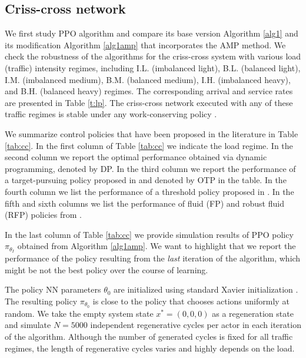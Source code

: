 \documentclass[11pt]{article}
\theoremstyle{definition}
\numberwithin{equation}{section}
\begin{document}
\subsection{Criss-cross network}

 We first study PPO algorithm and compare its base version Algorithm \ref{alg1} and its modification Algorithm \ref{alg1amp} that incorporates the  AMP method.  We check the robustness of the algorithms for the criss-cross system  with  various load (traffic) intensity regimes, including    I.L. (imbalanced light), B.L. (balanced light), I.M. (imbalanced medium), B.M. (balanced medium), I.H. (imbalanced heavy), and B.H. (balanced heavy) regimes.   The corresponding arrival and service rates are presented in Table \ref{t:lp}. The criss-cross network executed with any of these traffic regimes is stable under any work-conserving policy  \cite{Dai1996}.






We summarize control policies that have been proposed in the literature in Table \ref{tab:cc}. In the first column of Table \ref{tab:cc} we indicate the load regime. In the second column we report the optimal performance obtained via dynamic programming, denoted by DP.  In the third column
we report the performance of a target-pursuing
policy proposed in \cite{Paschalidis2004} and denoted by OTP in the table. In the fourth column we list the performance of a threshold policy proposed in \cite{Harrison1990}.
 In the fifth and sixth columns
we list the performance of fluid (FP) and robust fluid (RFP) policies from  \cite{Bertsimas2015}.

In the last column of Table \ref{tab:cc} we provide simulation results of PPO policy $\pi_{\theta_I}$ obtained from Algorithm \ref{alg1amp}. We want to highlight that we report the performance of the policy resulting from the \textit{last} iteration of the algorithm, which might be not the best policy over the course of learning. 

The policy NN parameters $\theta_0$ are initialized using standard Xavier initialization \cite{Glorot2010}.  The resulting policy $\pi_{\theta_0}$ is close to the policy that chooses actions uniformly at random.  We take the empty system state $x^* = (0,0,0)$ as a regeneration state and simulate $N=5000$ independent regenerative cycles  per actor in each iteration of the algorithm. Although the number of generated cycles is fixed for all traffic regimes, the length of regenerative cycles varies  and highly depends on the load. 
\end{document}
